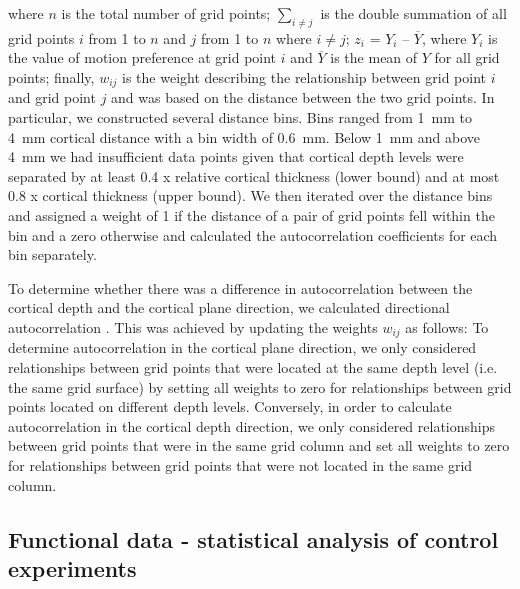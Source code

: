where $n$ is the total number of grid points; $\sum\limits_{i \neq j}$ is the double summation of all grid points $i$ from 1 to $n$ and $j$ from 1 to $n$ where $i \neq j$; $z_i$ = $Y_i$ – $\overline{Y}$, where $Y_i$ is the value of motion preference at grid point $i$ and $\overline{Y}$ is the mean of $Y$ for all grid points; finally, $w_{ij}$ is the weight describing the relationship between grid point $i$ and grid point $j$ and was based on the distance between the two grid points. In particular, we constructed several distance bins. Bins ranged from 1~mm to 4~mm cortical distance with a bin width of 0.6~mm. Below 1~mm and above 4~mm we had insufficient data points given that cortical depth levels were separated by at least 0.4 x relative cortical thickness (lower bound) and at most 0.8 x cortical thickness (upper bound). We then iterated over the distance bins and assigned a weight of 1 if the distance of a pair of grid points fell within the bin and a zero otherwise and calculated the autocorrelation coefficients for each bin separately.

To determine whether there was a difference in autocorrelation between the cortical depth and the cortical plane direction, we calculated directional autocorrelation \parencite{Oden1986, Rosenberg2010}. This was achieved by updating the weights $w_{ij}$ as follows: To determine autocorrelation in the cortical plane direction, we only considered relationships between grid points that were located at the same depth level (i.e. the same grid surface) by setting all weights to zero for relationships between grid points located on different depth levels. Conversely, in order to calculate autocorrelation in the cortical depth direction, we only considered relationships between grid points that were in the same grid column and set all weights to zero for relationships between grid points that were not located in the same grid column.

\subsection{Functional data - statistical analysis of control experiments}
